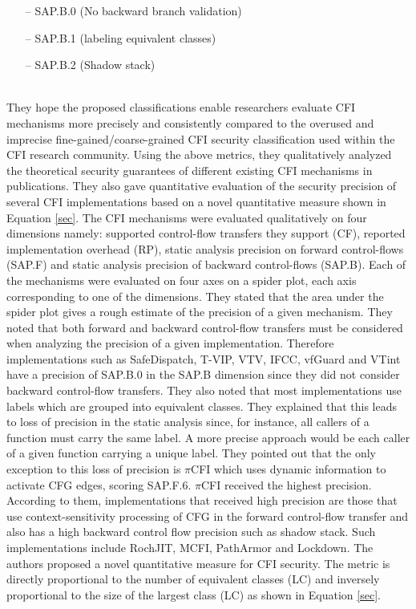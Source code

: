 \documentclass[dvips,12pt]{article}
\begin{document}
\begin{itemize}[noitemsep,nolistsep]
\item[--] SAP.B.0  (No backward branch validation)
\item[--] SAP.B.1  (labeling equivalent classes)
\item[--] SAP.B.2  (Shadow stack)
\end{itemize}
\ \\
They hope the proposed classifications enable researchers evaluate CFI mechanisms more precisely and consistently compared to the overused and imprecise fine-gained/coarse-grained CFI security classification used within the CFI research community.  
\newline
\newline
Using the above metrics, they qualitatively analyzed the theoretical security guarantees of different existing CFI mechanisms in publications. They also gave quantitative evaluation of the security precision of several CFI implementations based on a novel quantitative measure shown in Equation \ref{sec}. The CFI mechanisms were evaluated qualitatively on four dimensions namely: supported control-flow transfers they support (CF), reported implementation overhead (RP), static analysis precision on forward control-flows (SAP.F) and static analysis precision of backward control-flows (SAP.B). Each of the mechanisms were evaluated on four axes on a spider plot, each axis corresponding to one of the dimensions. They stated that the area under the spider plot gives a rough estimate of the precision of a given mechanism. They noted that both forward and backward control-flow transfers must be considered when analyzing the precision of a given implementation. Therefore implementations such as SafeDispatch, T-VIP, VTV, IFCC, vfGuard and VTint have a precision of SAP.B.0 in the SAP.B dimension since they did not consider backward control-flow transfers. They also noted that most implementations use labels which are grouped into equivalent classes. They explained that this leads to loss of precision in the static analysis since, for instance, all callers of a function must carry the same label. A more precise approach would be each caller of a given function carrying a unique label. They pointed out that the only exception to this loss of precision is $\pi$CFI which uses dynamic information to activate CFG edges, scoring SAP.F.6. $\pi$CFI received the highest precision. According to them, implementations that received high precision are those that use context-sensitivity processing of CFG in the forward control-flow transfer and also has a high backward control flow precision such as shadow stack. Such implementations include RochJIT, MCFI, PathArmor and Lockdown. The authors proposed a novel quantitative measure for CFI security. The metric is directly proportional to the number of equivalent classes (LC) and inversely proportional to the size of the largest class (LC) as shown in Equation \ref{sec}. 
\end{document}
